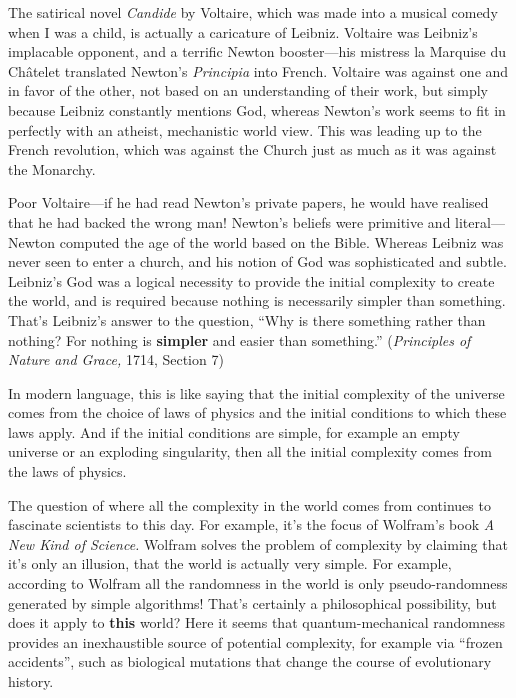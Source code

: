 \documentclass[12pt]{book}
\begin{document}
The satirical novel \emph{Candide} by Voltaire, which was made into a musical comedy
when I was a child, is actually a caricature of Leibniz.
Voltaire was Leibniz's implacable opponent, and a terrific Newton
booster---his mistress 
la Marquise du Ch\^atelet
translated Newton's \emph{Principia} into French.
Voltaire was against one and in favor of the other, not based on an understanding of
their work, but simply because Leibniz constantly mentions God, whereas Newton's work
seems to fit in perfectly with an atheist, mechanistic world view. 
This was leading up to the French revolution, which was against the Church just as much as 
it was against the Monarchy.
 
Poor Voltaire---if he had read Newton's private papers, he would have realised that
he had backed the wrong man!  Newton's beliefs were primitive and literal---Newton
computed the age of the world based on the Bible. Whereas Leibniz was never seen
to enter a church, and his notion of God 
was sophisticated and subtle.
Leibniz's God was a logical necessity
to provide the initial complexity to create the world, and is required because
nothing is necessarily simpler than something. That's Leibniz's answer to the 
question, 
``Why is there something rather than nothing? For nothing is \textbf{simpler} 
and easier than something.''
(\emph{Principles of Nature and Grace,} 1714, Section 7)
 
In modern language, this is like saying that the initial complexity of the universe
comes from the choice of laws of physics and the initial conditions to which these laws apply.
And if the initial conditions are simple, for example an empty universe or an exploding singularity, 
then all the initial complexity comes from the laws of physics.
 
The question of where all the complexity in the world comes from continues to fascinate
scientists to this day. For example, it's the focus of Wolfram's book \emph{A New Kind of Science.}
Wolfram solves
the problem of complexity by claiming that it's only an illusion, that the world is actually
very simple. For example, according to Wolfram
all the randomness in the world is only pseudo-randomness
generated by simple algorithms!  That's certainly a philosophical possibility, but
does it apply to \textbf{this} world?  Here it seems that quantum-mechanical randomness
provides an inexhaustible source of potential complexity, 
for example via ``frozen accidents'', 
such as biological mutations that change the course of evolutionary history.
 
\end{document}

